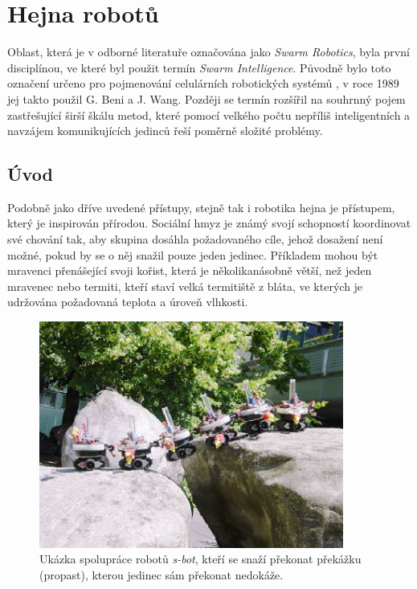 \documentclass[a4paper,12pt]{article}
\begin{document}
\newpage


\section{Hejna robotů}
Oblast, která je v odborné literatuře označována jako {\it Swarm Robotics}, byla první
disciplínou, ve které byl použit termín {\it Swarm Intelligence}. Původně bylo toto
označení určeno pro pojmenování celulárních robotických systémů \cite{BeniWang89}, v roce
1989 jej takto použil G. Beni a J. Wang. Později se termín rozšířil na souhrnný pojem
zastřešující širší škálu metod, které pomocí velkého počtu nepříliš inteligentních
a navzájem komunikujících jedinců řeší poměrně složité problémy.

\subsection{Úvod}
Podobně jako dříve uvedené přístupy, stejně tak i robotika hejna je přístupem, který
je inspirován přírodou. Sociální hmyz je známý svojí schopností koordinovat své
chování tak, aby skupina dosáhla požadovaného cíle, jehož dosažení není možné,
pokud by se o něj snažil pouze jeden jedinec. Příkladem mohou být mravenci
přenášející svoji kořist, která je několikanásobně větší, než jeden mravenec
nebo termiti, kteří staví velká termitiště z bláta, ve kterých je udržována
požadovaná teplota a úroveň vlhkosti.

\begin{figure}[here]
  \centering
  \includegraphics[width=10cm]{./img/sbot.png}
  \caption{Ukázka spolupráce robotů {\it s-bot}, kteří se snaží překonat překážku
    (propast), kterou jedinec sám překonat nedokáže.}
\end{figure}
\end{document}

